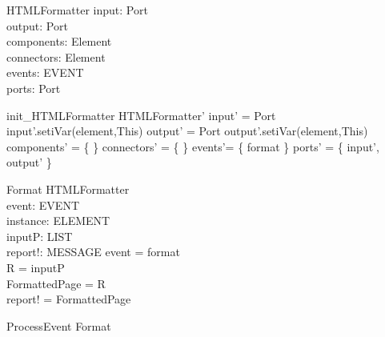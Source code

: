 \begin{schema}{HTMLFormatter}
input:  Port \\
output: Port \\
components: \pset Element \\
connectors: \pset Element \\
events: \pset EVENT \\
ports: \pset Port 
\end{schema}


\begin{zed}
init\_HTMLFormatter \sdef \lsch HTMLFormatter' \bbar input' = \new Port \land input'.setiVar(element,This) \land output' = \new Port \land output'.setiVar(element,This) \land components' = \{ \} \land  connectors' = \{ \} \land events'= \{ format \}  \land ports' = \{ input', output'   \} \rsch  \end{zed}

\begin{schema}{Format}
\Delta HTMLFormatter \\
event: EVENT \\
instance: ELEMENT \\
inputP: LIST \\
report!: MESSAGE
\where event = format \\ 
R = \head inputP \\
FormattedPage = R \\
report! = FormattedPage 
\end{schema}


\begin{zed} ProcessEvent \sdef Format
\end{zed}
